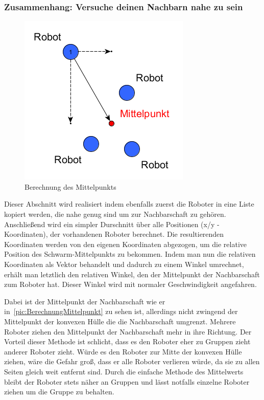 \subsubsection*{Zusammenhang: Versuche deinen Nachbarn nahe zu sein}

\begin{figure}
	\includegraphics[width=\pictureWidth,keepaspectratio]{graphics/SchwarmMittelpunktBerechnung.png}
	\caption{Berechnung des Mittelpunkts}
	\label{pic:BerechnungMittelpunkt}
\end{figure}

Dieser Abschnitt wird realisiert indem ebenfalls zuerst die Roboter in eine Liste kopiert werden, die nahe genug sind um zur Nachbarschaft zu gehören. Anschließend wird ein simpler Durschnitt über alle Positionen (x/y - Koordinaten), der vorhandenen Roboter berechnet. Die resultierenden Koordinaten werden von den eigenen Koordinaten abgezogen, um die relative Position des Schwarm-Mittelpunkts zu bekommen. Indem man nun die relativen Koordinaten als Vektor behandelt und dadurch zu einem Winkel umrechnet, erhält man letztlich den relativen Winkel, den der Mittelpunkt der Nachbarschaft zum Roboter hat. Dieser Winkel wird mit normaler Geschwindigkeit angefahren.

Dabei ist der Mittelpunkt der Nachbarschaft wie er in~\autoref{pic:BerechnungMittelpunkt} zu sehen ist, allerdings nicht zwingend der Mittelpunkt der konvexen Hülle die die Nachbarschaft umgrenzt. Mehrere Roboter ziehen den Mittelpunkt der Nachbarschaft mehr in ihre Richtung. Der Vorteil dieser Methode ist schlicht, dass es den Roboter eher zu Gruppen zieht anderer Roboter zieht. Würde es den Roboter zur Mitte der konvexen Hülle ziehen, wäre die Gefahr groß, dass er alle Roboter verlieren würde, da sie zu allen Seiten gleich weit entfernt sind. Durch die einfache Methode des Mittelwerts bleibt der Roboter stets näher an Gruppen und lässt notfalls einzelne Roboter ziehen um die Gruppe zu behalten.

